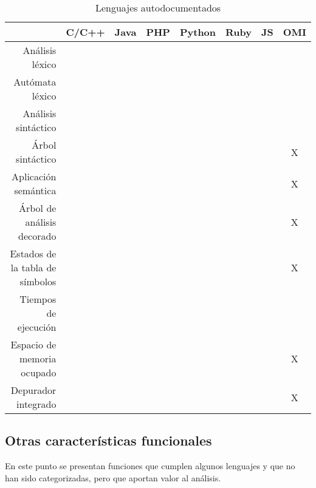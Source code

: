 \FloatBarrier
\begin{table}[h]
\begin{center}
 
\begin{tabular}{|r|c|c|c|c|c|c|c|} \hline
 & C/C++ & Java & PHP  & Python & Ruby & JS & OMI\\ \hline
Análisis léxico & &  &  &  &   &   &  \\ \hline
Autómata léxico & & &  &  &   &   &  \\ \hline
Análisis sintáctico & & &  &  &   &   &  \\ \hline
Árbol sintáctico & & &  &  &   &   & X \\ \hline
Aplicación semántica & & &  &  &   &   & X \\ \hline
Árbol de análisis decorado & & &  &  &   &   & X \\ \hline
Estados de la tabla de símbolos & & &  &  &   &   & X \\ \hline
Tiempos de ejecución & & &  &  &   &   &  \\ \hline
Espacio de memoria ocupado & & &  &  &   &   & X \\ \hline
Depurador integrado & & &  &  &   &   & X \\ \hline
\end{tabular}
\caption{Lenguajes autodocumentados}
\end{center}
\end{table}
\FloatBarrier



\subsection{Otras características funcionales}
En este punto se presentan funciones que cumplen algunos lenguajes
y que no han sido categorizadas, pero que aportan 
valor al análisis.


